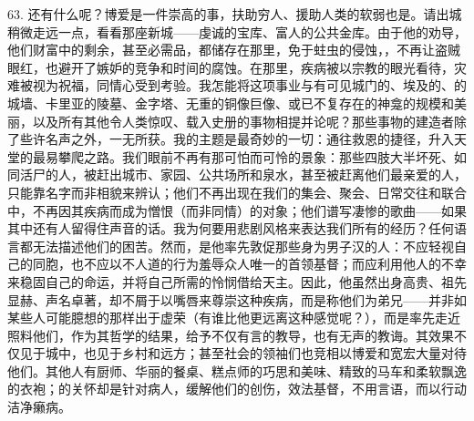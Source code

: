 63. 还有什么呢？博爱是一件崇高的事，扶助穷人、援助人类的软弱也是。请出城稍微走远一点，看看那座新城——虔诚的宝库、富人的公共金库。由于他的劝导，他们财富中的剩余，甚至必需品，都储存在那里，免于蛀虫的侵蚀，\newline{}，不再让盗贼眼红，也避开了嫉妒的竞争和时间的腐蚀。在那里，疾病被以宗教的眼光看待，灾难被视为祝福，同情心受到考验。我怎能将这项事业与有可见城门的、埃及的、的城墙、卡里亚的陵墓、金字塔、无重的铜像巨像、或已不复存在的神龛的规模和美丽，以及所有其他令人类惊叹、载入史册的事物相提并论呢？那些事物的建造者除了些许名声之外，一无所获。我的主题是最奇妙的一切：通往救恩的捷径，升入天堂的最易攀爬之路。我们眼前不再有那可怕而可怜的景象：那些四肢大半坏死、如同活尸的人，被赶出城市、家园、公共场所和泉水，甚至被赶离他们最亲爱的人，只能靠名字而非相貌来辨认；他们不再出现在我们的集会、聚会、日常交往和联合中，不再因其疾病而成为憎恨（而非同情）的对象；他们谱写凄惨的歌曲——如果其中还有人留得住声音的话。我为何要用悲剧风格来表达我们所有的经历？任何语言都无法描述他们的困苦。然而，是他率先敦促那些身为男子汉的人：不应轻视自己的同胞，也不应以不人道的行为羞辱众人唯一的首领基督；而应利用他人的不幸来稳固自己的命运，并将自己所需的怜悯借给天主。因此，他虽然出身高贵、祖先显赫、声名卓著，却不屑于以嘴唇来尊崇这种疾病，而是称他们为弟兄——并非如某些人可能臆想的那样出于虚荣（有谁比他更远离这种感觉呢？），而是率先走近照料他们，作为其哲学的结果，给予不仅有言的教导，也有无声的教诲。其效果不仅见于城中，也见于乡村和远方；甚至社会的领袖们也竞相以博爱和宽宏大量对待他们。其他人有厨师、华丽的餐桌、糕点师的巧思和美味、精致的马车和柔软飘逸的衣袍；的关怀却是针对病人，缓解他们的创伤，效法基督，不用言语，而以行动洁净癞病。\par

